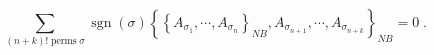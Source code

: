 \begin{equation}
\sum_{\left(  n+k\right)  !\;\text{perms}\;\sigma}\operatorname{sgn}\left(
\sigma\right)  \left\{  \left\{  A_{\sigma_{1}},\cdots,A_{\sigma_{n}}\right\}
_{NB},A_{\sigma_{n+1}},\cdots,A_{\sigma_{n+k}}\right\}  _{NB}=0\;.
\end{equation}

